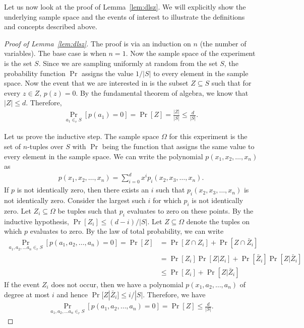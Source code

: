 Let us now look at the proof of Lemma~\ref{lem:dlsz}. We will explicitly show
the underlying sample space and the events of interest to illustrate the
definitions and concepts described above.
\begin{proof}
	[Proof of Lemma~\ref{lem:dlsz}]
	The proof is via an induction on $n$ (the number of variables). The base
        case is when $n=1$. Now the sample space of the experiment is the set
        $S$. Since we are sampling uniformly at random from the set $S$, the
        probability function $\Pr$ assigns the value $1/|S|$ to every element in
        the sample space. Now the event that we are interested in is the subset
        $Z \subseteq S$ such that for every $z\in Z$, $p(z)=0$. By the
        fundamental theorem of algebra, we know that $|Z| \leq d$. Therefore,
	\begin{align*}
          \Pr_{a_1 \in_r S} \left[p(a_1) = 0\right] = \Pr[Z] = \frac{|Z|}{|S|} \leq \frac{d}{|S|}.
	\end{align*}
	
	Let us prove the inductive step. The sample space $\Omega$ for this
        experiment is the set of $n$-tuples over $S$ with $\Pr$ being the
        function that assigns the same value to every element in the sample
        space. We can write the polynomial $p(x_1, x_2, \ldots, x_n)$ as
	\begin{align*}
          p(x_1, x_2, \ldots, x_n) = \sum_{i=0}^d x^i p_i(x_2, x_3, \ldots, x_n).
	\end{align*}
	If $p$ is not identically zero, then there exists an $i$ such that
        $p_i(x_2, x_3, \ldots, x_n)$ is not identically zero. Consider the
        largest such $i$ for which $p_i$ is not identically zero. Let
        $Z_i \subseteq \Omega$ be tuples such that $p_i$ evaluates to zero on
        these points. By the inductive hypothesis, $\Pr[Z_i] \leq
        (d-i)/|S|$. Let $Z \subseteq \Omega$ denote the tuples on which $p$
        evaluates to zero. By the law of total probability, we can write
	\begin{align*}
          \Pr_{a_1, a_2, \ldots a_n \in_r S} \left[ p(a_1, a_2, \ldots, a_n) = 0  \right]  = \Pr[Z] &= \Pr[Z\cap Z_i] + \Pr[Z\cap \bar{Z}_i]\\
                                                                                                    &= \Pr[Z_i]\Pr[Z|Z_i] + \Pr[\bar{Z}_i]\Pr[Z|\bar{Z}_i]\\
                                                                                                    &\leq \Pr[Z_i] + \Pr[Z|\bar{Z}_i]
	\end{align*}
	If the event $Z_i$ does not occur, then we have a polynomial
        $p(x_1, a_2, \ldots, a_n)$ of degree at most $i$ and hence
        $\Pr[Z|\bar{Z}_i] \leq i/|S|$. Therefore, we have
	\begin{align*}
          \Pr_{a_1, a_2, \ldots a_n \in_r S} \left[ p(a_1, a_2, \ldots, a_n) = 0  \right]  = \Pr[Z] \leq \frac{d}{|S|}.
	\end{align*}
\end{proof}

